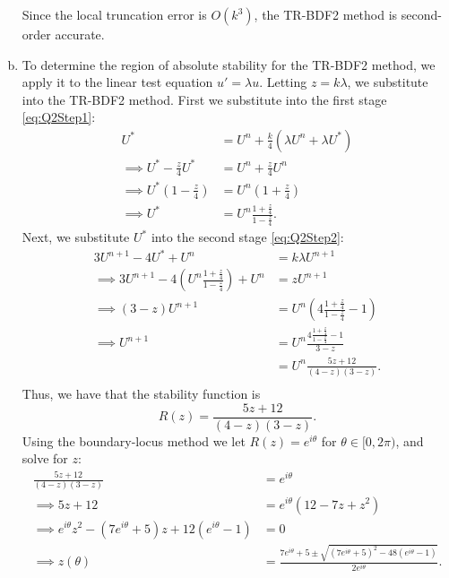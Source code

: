 \documentclass{article}
\begin{document}
\begin{enumerate}[(a)]
    Since the local truncation error is $O(k^3)$, the TR-BDF2 method is second-order accurate.





    \item To determine the region of absolute stability for the TR-BDF2 method, we apply it to the linear test equation $u' = \lambda u$. Letting $z = k\lambda$, we substitute into the TR-BDF2 method. First we substitute into the first stage \eqref{eq:Q2Step1}:
    \begin{align*}
        U^{*} &= U^n + \frac{k}{4}(\lambda U^n + \lambda U^{*}) \\
        \implies U^{*} - \frac{z}{4}U^{*} &= U^n + \frac{z}{4}U^n \\
        \implies U^{*}\left(1 - \frac{z}{4}\right) &= U^n\left(1 + \frac{z}{4}\right) \\
        \implies U^{*} &= U^n \frac{1 + \frac{z}{4}}{1 - \frac{z}{4}}.
    \end{align*}
    Next, we substitute $U^{*}$ into the second stage \eqref{eq:Q2Step2}:
    \begin{align*}
        3U^{n+1} - 4U^{*} + U^n &= k\lambda U^{n+1} \\
        \implies 3U^{n+1} - 4\left(U^n \frac{1 + \frac{z}{4}}{1 - \frac{z}{4}}\right) + U^n &= z U^{n+1} \\
        \implies (3 - z)U^{n+1} &= U^n\left(4\frac{1 + \frac{z}{4}}{1 - \frac{z}{4}} - 1\right) \\
        \implies U^{n+1} &= U^n \frac{4\frac{1 + \frac{z}{4}}{1 - \frac{z}{4}} - 1}{3 - z} \\
                        &= U^n \frac{5z + 12}{(4-z)(3 - z)}. \\
    \end{align*}
    Thus, we have that the stability function is
    \begin{equation}
        R(z) = \frac{5z + 12}{(4-z)(3 - z)}. \label{eq:Q2StabilFunc}
    \end{equation}
    Using the boundary-locus method we let $R(z) = e^{i\theta}$ for $\theta \in [0, 2\pi)$, and solve for $z$:
    \begin{align*}
        \frac{5z + 12}{(4-z)(3 - z)} &= e^{i\theta} \\
        \implies 5z + 12 &= e^{i\theta}(12 - 7z + z^2) \\
        \implies e^{i\theta} z^2 - (7e^{i\theta} + 5)z + 12(e^{i\theta} - 1) &= 0 \\
        \implies z(\theta) &= \frac{7e^{i\theta} + 5 \pm \sqrt{(7e^{i\theta} + 5)^2 - 48(e^{i\theta} - 1)}}{2e^{i\theta}}.

\end{align*}
\end{enumerate}
\end{document}
